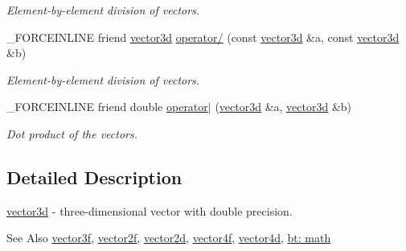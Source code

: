 \begin{DoxyCompactItemize}
\begin{DoxyCompactList}\small\item\em Element-\/by-\/element division of vectors. \end{DoxyCompactList}\item 
\hypertarget{classbt_1_1vector3d_a74fe791eb661bebfc8e6fca9331e6751}{\-\_\-\-F\-O\-R\-C\-E\-I\-N\-L\-I\-N\-E friend \hyperlink{classbt_1_1vector3d}{vector3d} \hyperlink{classbt_1_1vector3d_a74fe791eb661bebfc8e6fca9331e6751}{operator/} (const \hyperlink{classbt_1_1vector3d}{vector3d} \&a, const \hyperlink{classbt_1_1vector3d}{vector3d} \&b)}\label{classbt_1_1vector3d_a74fe791eb661bebfc8e6fca9331e6751}

\begin{DoxyCompactList}\small\item\em Element-\/by-\/element division of vectors. \end{DoxyCompactList}\item 
\hypertarget{classbt_1_1vector3d_a0da054ca35014bbc82164a941bda82c5}{\-\_\-\-F\-O\-R\-C\-E\-I\-N\-L\-I\-N\-E friend double \hyperlink{classbt_1_1vector3d_a0da054ca35014bbc82164a941bda82c5}{operator$|$} (\hyperlink{classbt_1_1vector3d}{vector3d} \&a, \hyperlink{classbt_1_1vector3d}{vector3d} \&b)}\label{classbt_1_1vector3d_a0da054ca35014bbc82164a941bda82c5}

\begin{DoxyCompactList}\small\item\em Dot product of the vectors. \end{DoxyCompactList}\end{DoxyCompactItemize}


\subsection{Detailed Description}
\hyperlink{classbt_1_1vector3d}{vector3d} -\/ three-\/dimensional vector with double precision. 

\begin{DoxySeeAlso}{See Also}
\hyperlink{classbt_1_1vector3f}{vector3f}, \hyperlink{classbt_1_1vector2f}{vector2f}, \hyperlink{classbt_1_1vector2d}{vector2d}, \hyperlink{classbt_1_1vector4f}{vector4f}, \hyperlink{classbt_1_1vector4d}{vector4d}, \hyperlink{group__math}{bt\-: math} 
\end{DoxySeeAlso}


